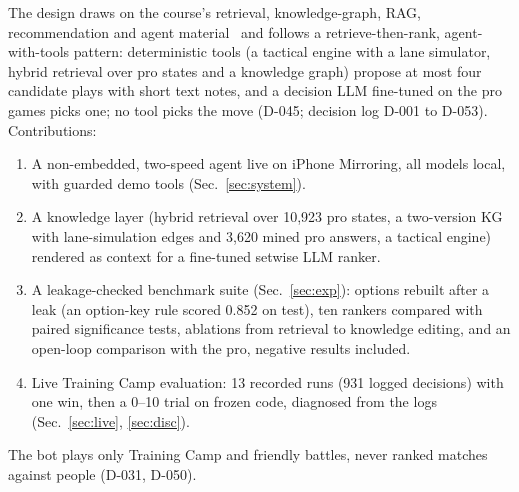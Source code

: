 The design draws on the course's retrieval, knowledge-graph, RAG, recommendation and agent material~\cite{cap6938L08,cap6938L05,lim2026l11,lim2026l13,lim2026l15} and follows a retrieve-then-rank, agent-with-tools pattern: deterministic tools (a tactical engine with a lane simulator, hybrid retrieval over pro states and a knowledge graph) propose at most four candidate plays with short text notes, and a decision LLM fine-tuned on the pro games picks one; no tool picks the move (D-045; decision log D-001 to D-053). Contributions:
\begin{enumerate}
\item A non-embedded, two-speed agent live on iPhone Mirroring, all models local, with guarded demo tools (Sec.~\ref{sec:system}).
\item A knowledge layer (hybrid retrieval over 10,923 pro states, a two-version KG with lane-simulation edges and 3,620 mined pro answers, a tactical engine) rendered as context for a fine-tuned setwise LLM ranker. %
\item A leakage-checked benchmark suite (Sec.~\ref{sec:exp}): options rebuilt after a leak (an option-key rule scored 0.852 on test), ten rankers compared with paired significance tests, ablations from retrieval to knowledge editing, and an open-loop comparison with the pro, negative results included. %
\item Live Training Camp evaluation: 13 recorded runs (931 logged decisions) with one win, then a 0--10 trial on frozen code, diagnosed from the logs (Sec.~\ref{sec:live}, \ref{sec:disc}). %
\end{enumerate}
The bot plays only Training Camp and friendly battles, never ranked matches against people (D-031, D-050).

